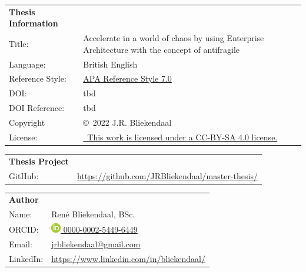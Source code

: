 \thispagestyle{plain}
	\begin{tabular}{p{}p{}}
		\textbf{Thesis Information} & \\
		Title: & Accelerate in a world of chaos by using Enterprise Architecture with the concept of antifragile \\
		Language: & British English \\
		Reference Style: & \href{https://apastyle.apa.org/products/publication-manual-7th-edition}{APA Reference Style 7.0}\\
		DOI: & tbd \\
		DOI Reference: & tbd \\
		Copyright & \copyright\ 2022 J.R. Bliekendaal\\
		License: & \href{https://creativecommons.org/licenses/by-sa/4.0/}{\ccbysa\ This work is licensed under a CC-BY-SA 4.0 license.}\\
	\end{tabular}

\vspace{\baselineskip}

	\begin{tabular}{p{}p{}}
		\textbf{Thesis Project} & \\
		GitHub: & \url{https://github.com/JRBliekendaal/master-thesis/}\\
	\end{tabular}

\vspace{\baselineskip}

	\begin{tabular}{p{}p{}}
		\textbf{Author} & \\
		Name: & René Bliekendaal, BSc. \\
		ORCID: & \href{https://orcid.org/0000-0002-5449-6449/}{\includegraphics[scale=0.45]{images/ORCIDiD_icon} 0000-0002-5449-6449}\\
		Email: & \href{mailto:jrbliekendaal@gmail.com}{jrbliekendaal@gmail.com}\\
		LinkedIn: & \url{https://www.linkedin.com/in/bliekendaal/}\\
	\end{tabular}

\vspace{\baselineskip}

